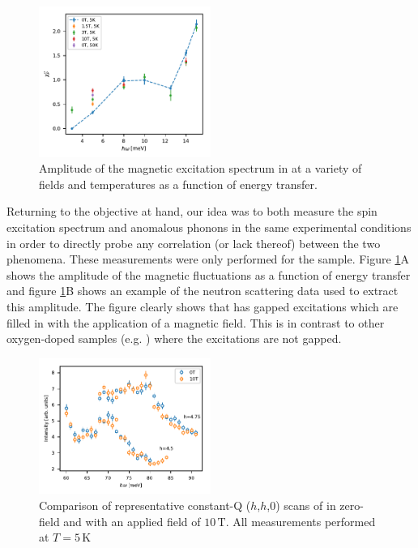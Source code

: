 \begin{figure}[]
    \centering
    \includegraphics[width=0.5\textwidth]{fig/anomaly/chi.pdf}
    \caption{Amplitude of the magnetic excitation spectrum in \LSCOOsix{} at a variety of fields and temperatures as a function of energy transfer.}
    \label{fig:lscoo_chi}
\end{figure}

Returning to the objective at hand, our idea was to both measure the spin excitation spectrum and anomalous phonons in the same experimental conditions in order to directly probe any correlation (or lack thereof) between the two phenomena. These measurements were only performed for the \LSCOOsix{} sample. Figure \ref{fig:lscoo_chi}A shows the amplitude of the magnetic fluctuations as a function of energy transfer and figure \ref{fig:lscoo_chi}B shows an example of the neutron scattering data used to extract this amplitude. The figure clearly shows that \LSCOOsix{} has gapped excitations which are filled in with the application of a magnetic field. This is in contrast to other oxygen-doped samples (e.g. \LCOO{} \cite{Jacobsen2018}) where the excitations are not gapped.

\begin{figure}
    \centering
    \includegraphics[width=0.5\textwidth]{fig/anomaly/fig4.pdf}
    \caption{Comparison of representative constant-Q ($h$,$h$,0) scans of \LSCOOsix{} in zero-field and with an applied field of $10\,\text{T}$. All measurements performed at $T=5\,\text{K}$}
    \label{fig:in8_lscoo_field}
\end{figure}

